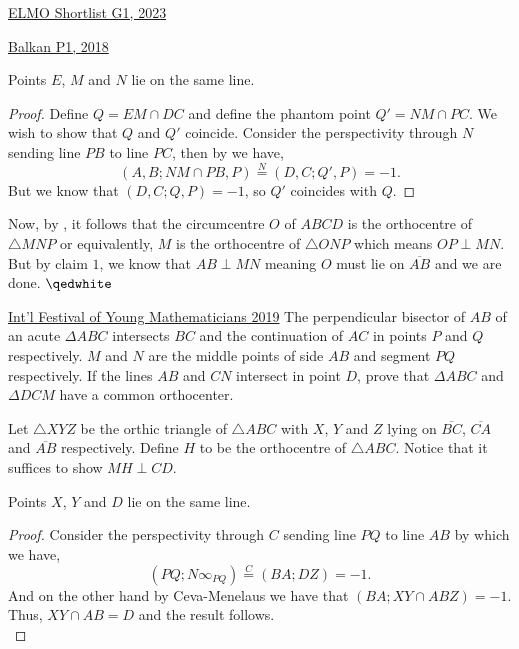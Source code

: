 \begin{problem}{14}{\href{https://artofproblemsolving.com/community/c6h3100572p28033718}{ELMO Shortlist G1, 2023}}
\begin{problem}{3}{\href{https://artofproblemsolving.com/community/u571929h1640635p35544553}{Balkan P1, 2018}}
\begin{numsolution}{2}
	\begin{claim}
		Points $E$, $M$ and $N$ lie on the same line.
	\end{claim}
	\begin{proof} Define $Q=EM\cap DC$ and define the phantom point $Q'=NM\cap PC$. We wish to show that $Q$ and $Q'$ coincide. Consider the perspectivity through $N$ sending line $PB$ to line $PC$, then by  we have,
$$(A,B; NM\cap PB, P)\overset{N}{=}(D, C; Q', P)=-1.$$But we know that $(D,C; Q,P)=-1$, so $Q'$ coincides with $Q$.
	\end{proof}
	
	\indent Now, by , it follows that the circumcentre $O$ of $ABCD$ is the orthocentre of $\triangle MNP$ or equivalently, $M$ is the orthocentre of $\triangle ONP$ which means $OP\perp MN$. But by claim $1$, we know that $AB\perp MN$ meaning $O$ must lie on $\overline{AB}$ and we are done. $\qedwhite$
	\end{numsolution}
\end{problem}
	
\begin{problem}{4}{\href{https://artofproblemsolving.com/community/q2h1920217p35604706}{Int'l Festival of Young Mathematicians 2019}} 
	The perpendicular bisector of $AB$ of an acute $\Delta ABC$ intersects $BC$ and the continuation of $AC$ in points $P$ and $Q$ respectively. $M$ and $N$ are the middle points of side $AB$ and segment $PQ$ respectively. If the lines $AB$ and $CN$ intersect in point $D$, prove that $\Delta ABC$ and $\Delta DCM$ have a common orthocenter.
	\begin{solution} Let $\triangle XYZ$ be the orthic triangle of $\triangle ABC$ with $X$, $Y$ and $Z$ lying on $\overline{BC}$, $\overline{CA}$ and $\overline{AB}$ respectively. Define $H$ to be the orthocentre of $\triangle ABC$. Notice that it suffices to show $MH\perp CD$.

	\begin{numclaim}{1} Points $X$, $Y$ and $D$ lie on the same line.
		\end{numclaim}
	\begin{proof} Consider the perspectivity through $C$ sending line $PQ$ to line $AB$ by which we have,
$$(PQ; N\infty_{PQ})\overset{C}{=}(BA; DZ)=-1.$$And on the other hand by Ceva-Menelaus we have that $(BA; XY\cap AB Z)=-1$. Thus, $XY\cap AB=D$ and the result follows.\\
	\end{proof}
	

\end{solution}
\end{problem}
\end{problem}
